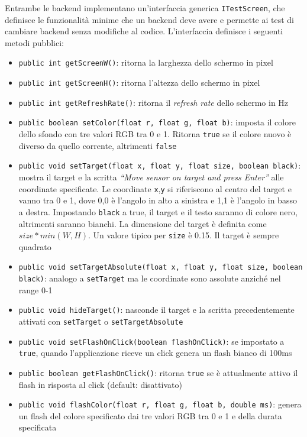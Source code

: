 Entrambe le backend implementano un'interfaccia generica \texttt{ITestScreen}, che definisce le funzionalità minime che un backend deve avere e permette ai test di cambiare backend senza modifiche al codice. L'interfaccia definisce i seguenti metodi pubblici:
\begin{itemize}
	\item \texttt{public int getScreenW()}: ritorna la larghezza dello schermo in pixel
	\item \texttt{public int getScreenH()}: ritorna l'altezza dello schermo in pixel
	\item \texttt{public int getRefreshRate()}: ritorna il \textit{refresh rate} dello schermo in Hz
	\item \texttt{public boolean setColor(float r, float g, float b)}: imposta il colore dello sfondo con tre valori RGB tra 0 e 1. Ritorna \texttt{true} se il colore nuovo è diverso da quello corrente, altrimenti \texttt{false}
	\item \texttt{public void setTarget(float x, float y, float size, boolean black)}: mostra il target e la scritta \textit{``Move sensor on target and press Enter''} alle coordinate specificate. Le coordinate \texttt{x},\texttt{y} si riferiscono al centro del target e vanno tra 0 e 1, dove 0,0 è l'angolo in alto a sinistra e 1,1 è l'angolo in basso a destra. Impostando \texttt{black} a true, il target e il testo saranno di colore nero, altrimenti saranno bianchi. La dimensione del target è definita come ${size*min(W,H)}$. Un valore tipico per \texttt{size} è 0.15. Il target è sempre quadrato
	\item \texttt{public void setTargetAbsolute(float x, float y, float size, boolean black)}: analogo a \texttt{setTarget} ma le coordinate sono assolute anziché nel range 0-1
	\item \texttt{public void hideTarget()}: nasconde il target e la scritta precedentemente attivati con \texttt{setTarget} o \texttt{setTargetAbsolute}
	\item \texttt{public void setFlashOnClick(boolean flashOnClick)}: se impostato a \texttt{true}, quando l'applicazione riceve un click genera un flash bianco di 100ms
	\item \texttt{public boolean getFlashOnClick()}: ritorna \texttt{true} se è attualmente attivo il flash in risposta al click (default: disattivato)
	\item \texttt{public void flashColor(float r, float g, float b, double ms)}: genera un flash del colore specificato dai tre valori RGB tra 0 e 1 e della durata specificata

\end{itemize}

